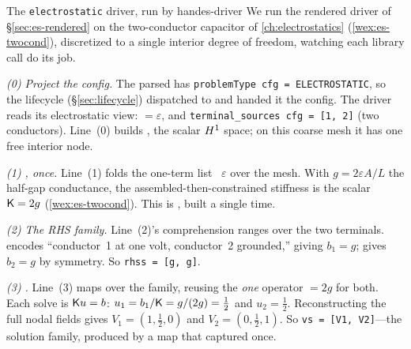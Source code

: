 \begin{workedexample}{The \texttt{electrostatic} driver, run by hand}{es-driver}
We run the rendered driver of \S\ref{sec:es-rendered} on the two-conductor capacitor
of \cref{ch:electrostatics} (\cref{wex:es-twocond}), discretized to a single interior
degree of freedom, watching each library call do its job.

\medskip
\emph{(0) Project the config.} The parsed  has
\lstinline[style=l4style]|problemType cfg = ELECTROSTATIC|, so the lifecycle
(\S\ref{sec:lifecycle}) dispatched to  and handed it the config.
The driver reads its electrostatic view:  $=\varepsilon$, and
\lstinline[style=l4style]|terminal_sources cfg = [1, 2]| (two conductors). Line~(0)
builds , the scalar $H^1$ space; on this coarse mesh it
has one free interior node.

\emph{(1) , once.} Line~(1) folds the one-term list
\code{[\,diffusion}~$\varepsilon$\code{\,]} over the mesh. With $g=2\varepsilon A/L$
the half-gap conductance, the assembled-then-constrained stiffness is the scalar
$\mathsf{K}=2g$ (\cref{wex:es-twocond}). This is , built a single time.

\emph{(2) The RHS family.} Line~(2)'s comprehension ranges over the two terminals.
 encodes ``conductor~1 at one volt, conductor~2 grounded,''
giving $b_1=g$;  gives $b_2=g$ by symmetry. So
\lstinline[style=l4style]|rhss = [g, g]|.

\emph{(3) .} Line~(3) maps  over the
family, reusing the \emph{one} operator  $=2g$ for both. Each solve is
$\mathsf{K} u=b$: $u_1=b_1/\mathsf{K}=g/(2g)=\tfrac12$ and $u_2=\tfrac12$. Reconstructing the full
nodal fields gives $V_1=(1,\tfrac12,0)$ and $V_2=(0,\tfrac12,1)$. So
\lstinline[style=l4style]|vs = [V1, V2]|---the solution family, produced by a map that
captured  once.


\end{workedexample}

